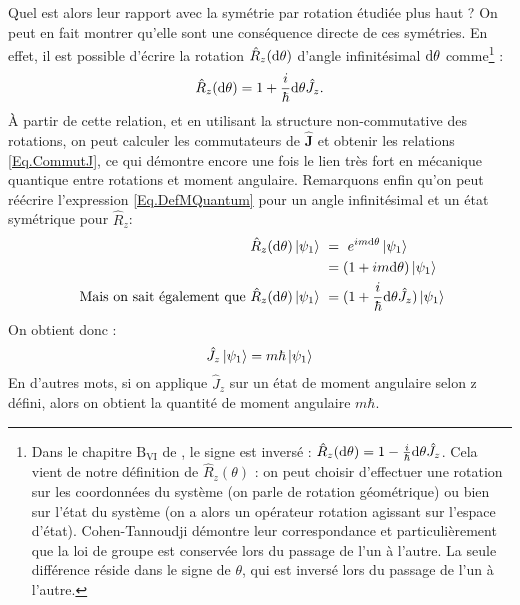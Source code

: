 Quel est alors leur rapport avec la symétrie par rotation étudiée plus haut ? On peut en fait montrer qu'elle sont une conséquence directe de ces symétries. En effet, il est possible d'écrire la rotation $\hat{R}_z(\mathrm{d}\theta)$ d'angle infinitésimal $\mathrm{d}\theta$ comme\footnote{Dans le chapitre $\text{B}_{\text{VI}}$ de , le signe est inversé : $\hat{R}_z(\mathrm{d}\theta) = 1-\frac{i}{\hbar}\mathrm{d} \theta \hat{J}_z$. Cela vient de notre définition de $\hat{R}_z(\theta)$ : on peut choisir d'effectuer une rotation sur les coordonnées du système (on parle de rotation géométrique) ou bien sur l'état du système (on a alors un opérateur rotation agissant sur l'espace d'état). Cohen-Tannoudji démontre leur correspondance et particulièrement que la loi de groupe est conservée lors du passage de l'un à l'autre. La seule différence réside dans le signe de $\theta$, qui est inversé lors du passage de l'un à l'autre.} :
\begin{equation*}
\hat{R}_z(\mathrm{d}\theta) = 1+\frac{i}{\hbar}\mathrm{d} \theta \hat{J}_z.
\end{equation*}
\`A partir de cette relation, et en utilisant la structure non-commutative des rotations, on peut calculer les commutateurs de $\bm{\hat{J}}$ et obtenir les relations \ref{Eq.CommutJ}, ce qui démontre encore une fois le lien très fort en mécanique quantique entre rotations et moment angulaire. Remarquons enfin qu'on peut réécrire l'expression \ref{Eq.DefMQuantum} pour un angle infinitésimal et un état symétrique pour $\hat{R}_z$:
\begin{align*}
\hat{R}_z(\mathrm{d}\theta)\ket{\psi_1}~&=~e^{im\mathrm{d}\theta}\ket{\psi_1}\\
~&=(1+im\mathrm{d}\theta)\ket{\psi_1}\\
\mbox{ Mais on sait également que }\hat{R}_z(\mathrm{d}\theta)\ket{\psi_1}~&=(1+\frac{i}{\hbar}\mathrm{d} \theta \hat{J}_z)\ket{\psi_1}
\end{align*}
On obtient donc : 
\begin{equation*}
\hat{J}_z\ket{\psi_1} = m\hbar\ket{\psi_1}
\end{equation*}
En d'autres mots, si on applique $\hat{J}_z$ sur un état de moment angulaire selon z défini, alors on obtient la quantité de moment angulaire $m\hbar$. 

